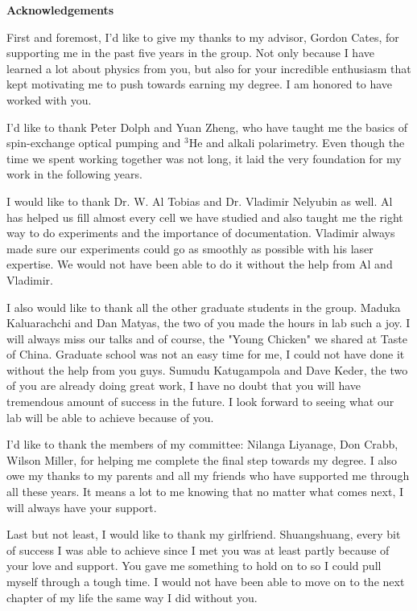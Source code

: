 \begin{center}
\textbf{\large Acknowledgements}
\end{center}

First and foremost, I'd like to give my thanks to my advisor, Gordon Cates, for supporting me in the past five years in the group. Not only because I have learned a lot about physics from you, but also for your incredible enthusiasm that kept motivating me to push towards earning my degree. I am honored to have worked with you.

I'd like to thank Peter Dolph and Yuan Zheng, who have taught me the basics of spin-exchange optical pumping and $^3$He and alkali polarimetry. Even though the time we spent working together was not long, it laid the very foundation for my work in the following years.

I would like to thank Dr. W. Al Tobias and Dr. Vladimir Nelyubin as well. Al has helped us fill almost every cell we have studied and also taught me the right way to do experiments and the importance of documentation. Vladimir always made sure our experiments could go as smoothly as possible with his laser expertise. We would not have been able to do it without the help from Al and Vladimir.

I also would like to thank all the other graduate students in the group. Maduka Kaluarachchi and Dan Matyas, the two of you made the hours in lab such a joy. I will always miss our talks and of course, the "Young Chicken" we shared at Taste of China. Graduate school was not an easy time for me, I could not have done it without the help from you guys. Sumudu Katugampola and Dave Keder, the two of you are already doing great work, I have no doubt that you will have tremendous amount of success in the future. I look forward to seeing what our lab will be able to achieve because of you.

I'd like to thank the members of my committee: Nilanga Liyanage, Don Crabb, Wilson Miller, for helping me complete the final step towards my degree. I also owe my thanks to my parents and all my friends who have supported me through all these years. It means a lot to me knowing that no matter what comes next, I will always have your support.

Last but not least, I would like to thank my girlfriend. Shuangshuang, every bit of success I was able to achieve since I met you was at least partly because of your love and support. You gave me something to hold on to so I could pull myself through a tough time. I would not have been able to move on to the next chapter of my life the same way I did without you.





